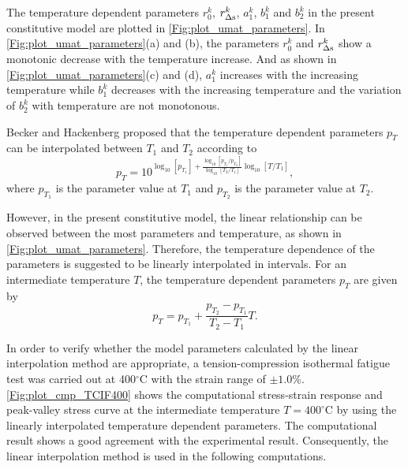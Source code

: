The temperature dependent parameters $r_0^k$, $r_{\Delta \rm{s}}^k$, $a_1^k$, $b_1^k$ and $b_2^k$ in the present constitutive model are plotted in \ref{Fig:plot_umat_parameters}. In \ref{Fig:plot_umat_parameters}(a) and (b), the parameters $r_0^k$ and $r_{\Delta \rm{s}}^k$ show a monotonic decrease with the temperature increase. And as shown in \ref{Fig:plot_umat_parameters}(c) and (d), $a_1^k$ increases with the increasing temperature while $b_1^k$ decreases with the increasing temperature and the variation of $b_2^k$ with temperature are not monotonous.

Becker and Hackenberg \cite{Becker2011596} proposed that the temperature dependent parameters $p_T$ can be interpolated between $T_1$ and $T_2$ according to
\[p_T = {10^{{{\log }_{10}}\left[ {{p_{{T_1}}}} \right] + \frac{{{{\log }_{10}}\left[ {{p_{{T_1}}}/{p_{{T_2}}}} \right]}}{{{{\log }_{10}}\left[ {{T_2}/{T_1}} \right]}}{{\log }_{10}}\left[ {T/{T_1}} \right]}},\]
where ${{p_{{T_1}}}}$ is the parameter value at $T_1$ and ${{p_{{T_2}}}}$ is the parameter value at $T_2$.

However, in the present constitutive model, the linear relationship can be observed between the most parameters and temperature, as shown in \ref{Fig:plot_umat_parameters}. Therefore, the temperature dependence of the parameters is suggested to be linearly interpolated in intervals. For an intermediate temperature $T$, the temperature dependent parameters $p_T$ are given by
\[{p_T} = {p_{{T_1}}} + \frac{{{p_{{T_2}}} - {p_{{T_1}}}}}{{{T_2} - {T_1}}}{T}.\]

In order to verify whether the model parameters calculated by the linear interpolation method are appropriate, a tension-compression isothermal fatigue test was carried out at 400$^\circ$C with the strain range of $\pm1.0\%$.
\ref{Fig:plot_cmp_TCIF400} shows the computational stress-strain response and peak-valley stress curve at the intermediate temperature $T=400^\circ$C by using the linearly interpolated temperature dependent parameters. The computational result shows a good agreement with the experimental result. Consequently, the linear interpolation method is used in the following computations.



